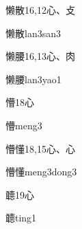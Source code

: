\begin{Entry}{懒散}{16,12}{⼼、⽁}
  \begin{Phonetics}{懒散}{lan3san3}
  \end{Phonetics}
\end{Entry}

\begin{Entry}{懒腰}{16,13}{⼼、⾁}
  \begin{Phonetics}{懒腰}{lan3yao1}
  \end{Phonetics}
\end{Entry}

\begin{Entry}{懵}{18}{⼼}
  \begin{Phonetics}{懵}{meng3}
  \end{Phonetics}
\end{Entry}

\begin{Entry}{懵懂}{18,15}{⼼、⼼}
  \begin{Phonetics}{懵懂}{meng3dong3}
  \end{Phonetics}
\end{Entry}

\begin{Entry}{聼}{19}{⼼}
  \begin{Phonetics}{聼}{ting1}
  \end{Phonetics}
\end{Entry}


